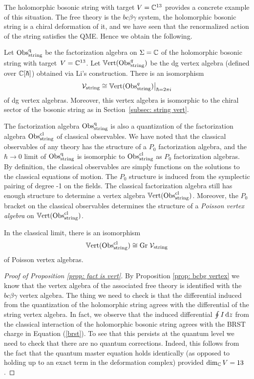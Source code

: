 The holomorphic bosonic string with target $V=\mathbb C^{13}$ provides a concrete example of this situation.
The free theory is the $bc\beta\gamma$ system,
the holomorphic bosonic string is a chiral deformation of it, 
and we have seen that the renormalized action of the string satisfies the QME.
Hence we obtain the following.

\begin{prop} 
\label{prop: fact is vert}
Let ${\rm Obs}^{\rm q}_{\rm string}$ be the factorization algebra on $\Sigma = \mathbb C$ of the holomorphic bosonic string with target~$V = \mathbb C^{13}$. 
Let $\mathbb{V}{\rm ert}({\rm Obs}^q_{\rm string})$ be the dg vertex algebra (defined over $\mathbb C[\hbar]$) obtained via Li's construction. 
There is an isomorphism  
\[
\mathcal{V}_{\rm string} \cong \mathbb{V}{\rm ert}({\rm Obs}^q_{\rm string})\big|_{\hbar = 2 \pi i}
\]
of dg vertex algebras.
Moreover, this vertex algebra is isomorphic to the chiral sector of the bosonic string as in Section~\ref{subsec: string vert}.
\end{prop}

The factorization algebra ${\rm Obs}^{\rm q}_{\rm string}$ is also a quantization of the factorization algebra ${\rm Obs}^{{\rm cl}}_{\rm string}$ of classical observables.
We have noted that the classical observables of any theory has the structure of a $P_0$ factorization algebra, and the $\hbar \to 0$ limit of ${\rm Obs}^{\rm q}_{\rm string}$ is isomorphic to ${\rm Obs}^{{\rm cl}}_{\rm string}$ as $P_0$ factorization algebras.
By definition, the classical observables are simply functions on the solutions to the classical equations of motion.
The $P_0$ structure is induced from the symplectic pairing of degree -1 on the fields. 
The classical factorization algebra still has enough structure to determine a vertex algebra $\mathbb{V}{\rm ert}({\rm Obs}^{\rm cl}_{\rm string})$.
Moreover, the $P_0$ bracket on the classical observables determines the structure of a {\em Poisson vertex algebra} on $\mathbb{V}{\rm ert}({\rm Obs}^{{\rm cl}}_{\rm string})$. 

\begin{cor} In the classical limit, there is an isomorphism 
\[
\mathbb{V}{\rm ert}({\rm Obs}^{{\rm cl}}_{\rm string}) \cong {\rm Gr} \; \mathcal{V}_{\rm string}
\]
of Poisson vertex algebras.
\end{cor}

\begin{proof}[Proof of Proposition \ref{prop: fact is vert}] By Proposition \ref{prop: bcbg vertex} we know that the vertex algebra of the associated free theory is identified with the $bc\beta\gamma$ vertex algebra. 
The thing we need to check is that the differential induced from the quantization of the holomorphic string agrees with the differential of the string vertex algebra. 
In fact, we observe that the induced differential $\oint I \,{\rm d} z$ from the classical interaction of the holomorphic bosonic string agrees with the BRST charge in Equation (\ref{brst}). 
To see that this persists at the quantum level we need to check that there are no quantum corrections. 
Indeed, this follows from the fact that the quantum master equation holds identically (as opposed to holding up to an exact term in the deformation complex) provided $\dim_\mathbb C V = 13$. 
\end{proof}

